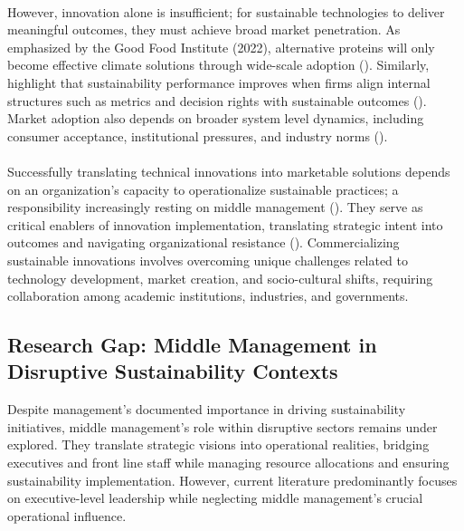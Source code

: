	\paragraph*{} However, innovation alone is insufficient; for sustainable technologies to deliver meaningful outcomes, they must achieve broad market penetration. As emphasized by the Good Food Institute (2022), alternative proteins will only become effective climate solutions through wide-scale adoption (\textcite{GFI2022}). Similarly, \citeauthor{Eccles2014} highlight that sustainability performance improves when firms align internal structures such as metrics and decision rights with sustainable outcomes (\textcite{Eccles2014}). Market adoption also depends on broader system level dynamics, including consumer acceptance, institutional pressures, and industry norms (\textcite{Hall2003, Geels2002}).
	
	\paragraph*{} Successfully translating technical innovations into marketable solutions depends on an organization's capacity to operationalize sustainable practices; a responsibility increasingly resting on middle management (\textcite{Rafaeli2022}). They serve as critical enablers of innovation implementation, translating strategic intent into outcomes and navigating organizational resistance (\textcite{birkinshaw2004}). Commercializing sustainable innovations involves overcoming unique challenges related to technology development, market creation, and socio-cultural shifts, requiring collaboration among academic institutions, industries, and governments.
	
	\subsection{Research Gap: Middle Management in Disruptive Sustainability Contexts}
	Despite management's documented importance in driving sustainability initiatives, middle management's role within disruptive sectors remains under explored. They translate strategic visions into operational realities, bridging executives and front line staff while managing resource allocations and ensuring sustainability implementation. However, current literature predominantly focuses on executive-level leadership while neglecting middle management’s crucial operational influence.
	
